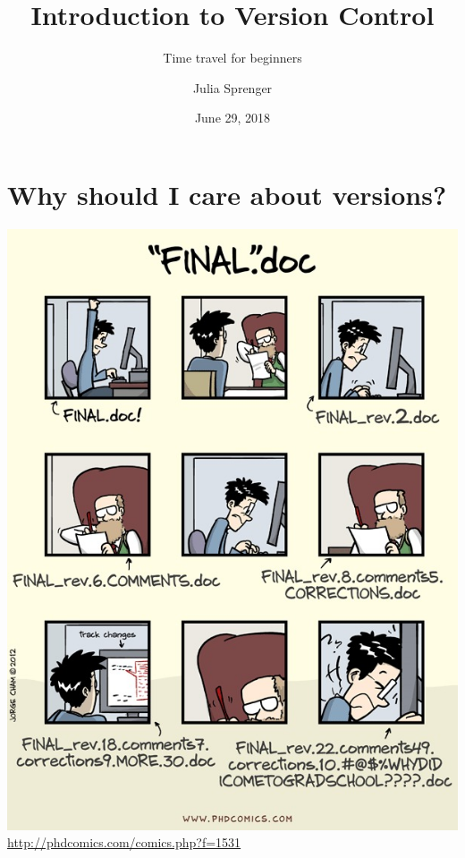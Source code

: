 \documentclass[
t, %
10pt, %
aspectratio=1610, %
ngerman,
english,
]{beamer}
\title{Introduction to Version Control}
\subtitle{Time travel for beginners}
\author{Julia Sprenger}
\institute[My Institute]{INM-6/10}
\date{June 29, 2018}
\begin{document}
\maketitle


\part{Why should I care about versions?}
\makepart

\begin{frame}
    \centering
    \includegraphics[height=\textheight]{graphics/phd101212s.jpg}\\
    \url{http://phdcomics.com/comics.php?f=1531}
\end{frame}
\end{document}
